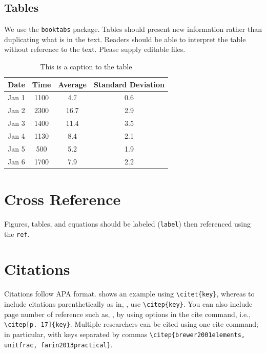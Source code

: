  

\subsection{Tables}
We use the \texttt{booktabs} package.  Tables should present new information rather than duplicating what is in the text. Readers should be able to interpret the table without reference to the text. Please supply editable files.


\begin{table}[ht!]
\begin{center}
\begin{tabular}{lccc} 
\toprule
Date & Time  &  Average   & Standard Deviation \\ 
\midrule
Jan 1  & 1100   		& 4.7            	& 0.6        \\
Jan 2  &  2300   	& 16.7                & 2.9       \\
Jan 3  &  1400  		& 11.4                & 3.5       \\
Jan 4  & 1130  		& 8.4              	& 2.1        \\
Jan 5  & 500  		& 5.2         	& 1.9 	\\
Jan 6  & 1700 		& 7.9             	& 2.2 	\\
\bottomrule 

\end{tabular} 
\caption{This is a caption to the table}
\label{tab:table} 
\end{center}
\end{table} %






\section{Cross Reference}
Figures, tables, and equations should be labeled (\texttt{label}) then referenced using the \texttt{ref}. 




%
%
\section{Citations}
Citations follow APA format.  \citet{brewer2001elements} shows an example using \verb!\citet{key}!, whereas to include citations parenthetically as in, \citep{brewer2001elements}, use \verb!\citep{key}!.  You can also include page number of reference such as, \citep[p. 17]{brewer2001elements}, by using options in the cite command, i.e.,  \verb!\citep[p. 17]{key}!.  Multiple researchers \citep{brewer2001elements, article:unitfrac, farin2013practical} can be cited using one cite command; in particular, with keys separated by commas  \verb!\citep{brewer2001elements, unitfrac, farin2013practical}!.







